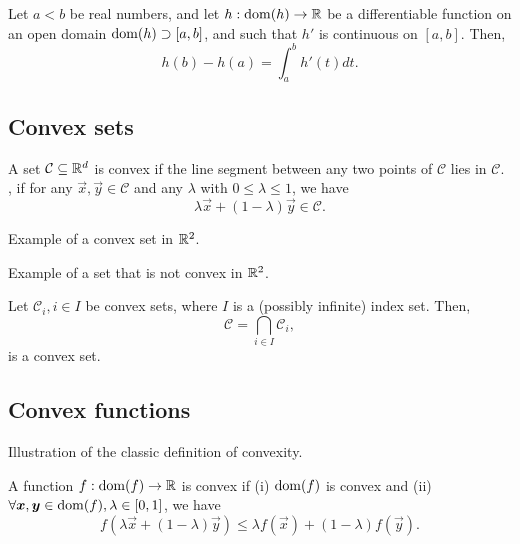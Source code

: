 \begin{theorem}
    Let $a<b$ be real numbers, and let $h: \mathrm{dom}(h) \to \mathbb{R}$ be a differentiable function on an open domain $\mathrm{dom}(h) \supset [a,b]$, and such that $h'$ is continuous on $[a,b]$. Then, \[
        h(b) - h(a) = \int_a^b h'(t)dt.
    \]
\end{theorem}

\subsection{Convex sets}

\begin{definition}
    A set $\mathcal{C}\subseteq \mathbb{R}^d$ is convex if the line segment between any two points of
    $\mathcal{C}$ lies in $\mathcal{C}$. \Ie, if for any $\vec{x},\vec{y}\in \mathcal{C}$ and any
    $\lambda$ with $0\leq \lambda \leq 1$, we have \[
        \lambda \vec{x} + (1-\lambda)\vec{y} \in \mathcal{C}.
    \]
\end{definition}

\begin{marginfigure}
    \centering
    \caption{Example of a convex set in $\mathbb{R}^2$.}
    \label{fig:convex-set-example}
\end{marginfigure}

\begin{marginfigure}
    \centering
    \caption{Example of a set that is not convex in $\mathbb{R}^2$.}
    \label{fig:non-convex-set-example}
\end{marginfigure}

\begin{lemma}
    Let $\mathcal{C}_i, i\in I$ be convex sets, where $I$ is a (possibly infinite) index set. Then, \[
        \mathcal{C} = \bigcap_{i\in I} \mathcal{C}_i,
    \]
    is a convex set.
\end{lemma}

\subsection{Convex functions}

\begin{marginfigure}
    \centering
    \caption{Illustration of the classic definition of convexity.}
    \label{fig:convexity}
\end{marginfigure}

\begin{definition}[Convexity]
    A function $f: \mathrm{dom}(f) \to \mathbb{R}$ is convex if (i) $\mathrm{dom}(f)$ is convex and (ii)
    $\forall \bm{x}, \bm{y}\in\mathrm{dom}(f), \lambda\in[0,1]$, we have \[
        f(\lambda \vec{x} + (1-\lambda) \vec{y}) \leq \lambda f(\vec{x}) + (1-\lambda) f(\vec{y}).
    \]
\end{definition}

